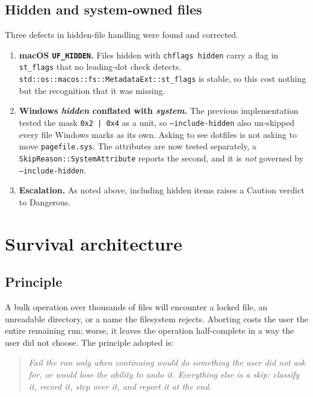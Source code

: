 \documentclass[11pt,a4paper]{article}
\newcommand{\code}[1]{\texttt{\small #1}}
\begin{document}
\subsection{Hidden and system-owned files}

Three defects in hidden-file handling were found and corrected.

\begin{enumerate}[leftmargin=1.6em,itemsep=0.2em]
  \item \textbf{macOS \code{UF\_HIDDEN}.} Files hidden with \code{chflags hidden}
    carry a flag in \code{st\_flags} that no leading-dot check detects.
    \code{std::os::macos::fs::MetadataExt::st\_flags} is stable, so this cost nothing
    but the recognition that it was missing.
  \item \textbf{Windows \textit{hidden} conflated with \textit{system}.} The previous
    implementation tested the mask \code{0x2 | 0x4} as a unit, so
    \code{--include-hidden} also un-skipped every file Windows marks as its own.
    Asking to see dotfiles is not asking to move \code{pagefile.sys}. The attributes
    are now tested separately, a \code{SkipReason::SystemAttribute} reports the
    second, and it is \emph{not} governed by \code{--include-hidden}.
  \item \textbf{Escalation.} As noted above, including hidden items raises a
    \textsf{Caution} verdict to \textsf{Dangerous}.
\end{enumerate}

\section{Survival architecture}
\label{sec:survival}

\subsection{Principle}

A bulk operation over thousands of files will encounter a locked file, an unreadable
directory, or a name the filesystem rejects. Aborting costs the user the entire
remaining run; worse, it leaves the operation half-complete in a way the user did not
choose. The principle adopted is:

\begin{quote}
\itshape
Fail the run only when continuing would do something the user did not ask for, or
would lose the ability to undo it. Everything else is a skip: classify it, record it,
step over it, and report it at the end.
\end{quote}
\end{document}
